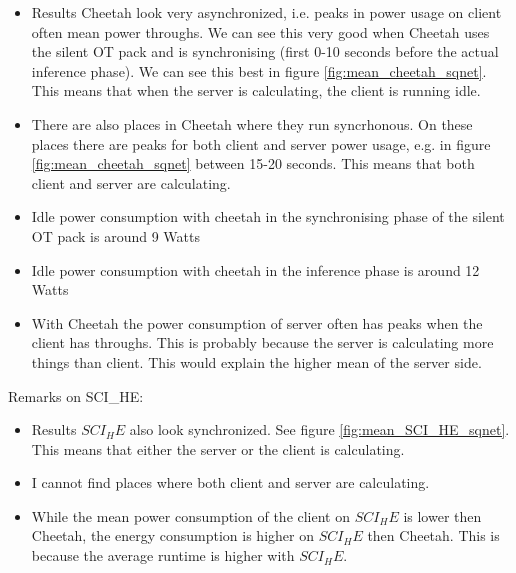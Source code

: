 \documentclass[../thesis.tex]{subfiles}
\begin{document}
\begin{itemize}
        \item Results Cheetah look very asynchronized, i.e. peaks in power usage on client often mean power throughs. We can see this very good when Cheetah uses the silent OT pack and is synchronising (first 0-10 seconds before the actual inference phase). We can see this best in figure \ref{fig:mean_cheetah_sqnet}. This means that when the server is calculating, the client is running idle.
        \item There are also places in Cheetah where they run syncrhonous. On these places there are peaks for both client and server power usage, e.g. in figure \ref{fig:mean_cheetah_sqnet} between 15-20 seconds. This means that both client and server are calculating.
        \item Idle power consumption with cheetah in the synchronising phase of the silent OT pack is around 9 Watts
        \item Idle power consumption with cheetah in the inference phase is around 12 Watts
        \item With Cheetah the power consumption of server often has peaks when the client has throughs. This is probably because the server is calculating more things than client. This would explain the higher mean of the server side. 
\end{itemize}
Remarks on SCI_HE:
\begin{itemize}
        \item Results $SCI_HE$ also look synchronized. See figure \ref{fig:mean_SCI_HE_sqnet}. This means that either the server or the client is calculating.
        \item I cannot find places where both client and server are calculating. 
        \item While the mean power consumption of the client on $SCI_HE$ is lower then Cheetah, the energy consumption is higher on $SCI_HE$ then Cheetah. This is because the average runtime is higher with $SCI_HE$.
\end{itemize}

     
\end{document}
